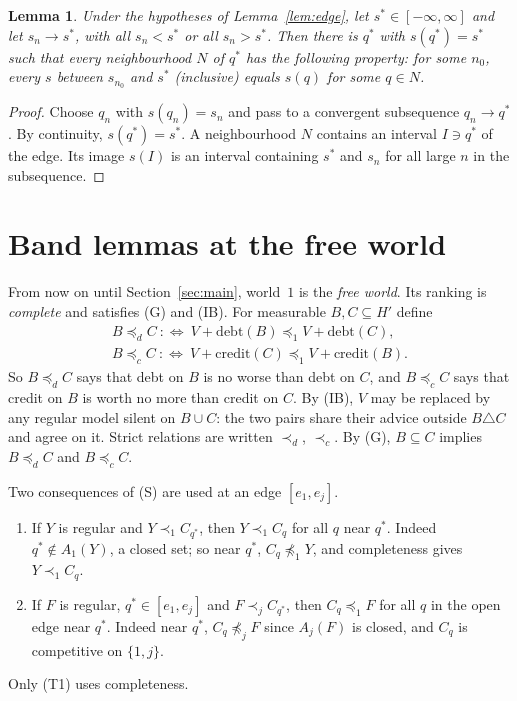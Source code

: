 \documentclass[11pt]{article}
\newtheorem{lemma}[theorem]{Lemma}
\theoremstyle{definition}\newtheorem{definition}[theorem]{Definition}
\theoremstyle{remark}\newtheorem{remark}[theorem]{Remark}
\newcommand{\debt}{\mathrm{debt}}
\newcommand{\cred}{\mathrm{credit}}
\begin{document}
\begin{lemma}\label{lem:approach}
Under the hypotheses of Lemma~\ref{lem:edge}, let $s^*\in[-\infty,\infty]$
and let $s_n\to s^*$, with all $s_n<s^*$ or all $s_n>s^*$. Then there is
$q^*$ with $s(q^*)=s^*$ such that every neighbourhood $N$ of $q^*$ has the
following property: for some $n_0$, every $s$ between $s_{n_0}$ and $s^*$
(inclusive) equals $s(q)$ for some $q\in N$.
\end{lemma}
\begin{proof}
Choose $q_n$ with $s(q_n)=s_n$ and pass to a convergent subsequence
$q_n\to q^*$. By continuity, $s(q^*)=s^*$. A neighbourhood $N$ contains an
interval $I\ni q^*$ of the edge. Its image $s(I)$ is an interval containing
$s^*$ and $s_n$ for all large $n$ in the subsequence.
\end{proof}

\section{Band lemmas at the free world}\label{sec:bands}

From now on until Section~\ref{sec:main}, world~$1$ is the \emph{free world}.
Its ranking is \emph{complete} and satisfies (G) and (IB). For measurable
$B,C\subseteq H'$ define
\begin{gather*}
 B\preceq_dC\ :\Longleftrightarrow\ V+\debt(B)\preceq_1V+\debt(C),\\
 B\preceq_cC\ :\Longleftrightarrow\ V+\cred(C)\preceq_1V+\cred(B).
\end{gather*}
So $B\preceq_dC$ says that debt on $B$ is no worse than debt on $C$, and
$B\preceq_cC$ says that credit on $B$ is worth no more than credit on $C$.
By (IB), $V$ may be replaced by any regular model silent on $B\cup C$: the
two pairs share their advice outside $B\triangle C$ and agree on it. Strict
relations are written $\prec_d$, $\prec_c$. By (G), $B\subseteq C$ implies
$B\preceq_dC$ and $B\preceq_cC$.

Two consequences of (S) are used at an edge $[e_1,e_j]$.
\begin{enumerate}[label=(T\arabic*),leftmargin=*,itemsep=2pt]
\item If $Y$ is regular and $Y\prec_1C_{q^*}$, then $Y\prec_1C_q$ for all
$q$ near $q^*$. Indeed $q^*\notin A_1(Y)$, a closed set; so near $q^*$,
$C_q\not\preceq_1Y$, and completeness gives $Y\prec_1C_q$.
\item If $F$ is regular, $q^*\in[e_1,e_j]$ and $F\prec_jC_{q^*}$, then
$C_q\preceq_1F$ for all $q$ in the open edge near $q^*$. Indeed near $q^*$,
$C_q\not\preceq_jF$ since $A_j(F)$ is closed, and $C_q$ is competitive on
$\{1,j\}$.
\end{enumerate}
Only (T1) uses completeness.
\end{document}
